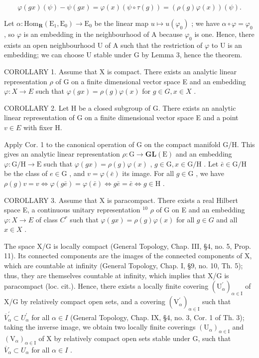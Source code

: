 \[
\varphi (g x) (\psi) - \psi (g x) = \varphi (x) (\psi \circ \tau (g)) = (\rho (g) \varphi (x)) (\psi).
\]

Let \(\alpha : \mathrm{Hom}_{\mathbf{R}}(\mathrm{E}_1, \mathrm{E}_0) \to \mathrm{E}_0\) be the linear map \(u \mapsto u(\varphi_0)\) ; we have \(\alpha \circ \varphi = \varphi_0\) , so \(\varphi\) is an embedding in the neighbourhood of A because \(\varphi_0\) is one. Hence, there exists an open neighbourhood U of A such that the restriction of \(\varphi\) to U is an embedding; we can choose U stable under G by Lemma 3, hence the theorem.

COROLLARY 1. Assume that X is compact. There exists an analytic linear representation \(\rho\) of G on a finite dimensional vector space E and an embedding \(\varphi: X \to E\) such that \(\varphi(gx) = \rho(g)\varphi(x)\) for \(g \in G, x \in X\) .

COROLLARY 2. Let H be a closed subgroup of G. There exists an analytic linear representation of G on a finite dimensional vector space E and a point \(v \in E\) with fixer H.

Apply Cor. 1 to the canonical operation of G on the compact manifold G/H. This gives an analytic linear representation \(\rho: \mathrm{G} \to \mathbf{GL}(\mathrm{E})\) and an embedding \(\varphi: \mathrm{G} / \mathrm{H} \to \mathrm{E}\) such that \(\varphi(gx) = \rho(g)\varphi(x)\) , \(g \in \mathrm{G}, x \in \mathrm{G} / \mathrm{H}\) . Let \(\bar{e} \in \mathrm{G} / \mathrm{H}\) be the class of \(e \in \mathrm{G}\) , and \(v = \varphi(\bar{e})\) its image. For all \(g \in \mathrm{G}\) , we have \(\rho(g)v = v \Longleftrightarrow \varphi(g\bar{e}) = \varphi(\bar{e}) \Longleftrightarrow g\bar{e} = \bar{e} \Longleftrightarrow g \in \mathrm{H}\) .

COROLLARY 3. Assume that X is paracompact. There exists a real Hilbert space E, a continuous unitary representation \({}^{10}\) \(\rho\) of G on E and an embedding \(\varphi: X \to E\) of class \(C^{r}\) such that \(\varphi(gx) = \rho(g)\varphi(x)\) for all \(g \in G\) and all \(x \in X\) .

The space X/G is locally compact (General Topology, Chap. III, §4, no. 5, Prop. 11). Its connected components are the images of the connected components of X, which are countable at infinity (General Topology, Chap. I, §9, no. 10, Th. 5); thus, they are themselves countable at infinity, which implies that X/G is paracompact (loc. cit.). Hence, there exists a locally finite covering \((\mathrm{U}_{\alpha}^{\prime})_{\alpha\in\mathrm{I}}\) of X/G by relatively compact open sets, and a covering \((\mathrm{V}_{\alpha}^{\prime})_{\alpha\in\mathrm{I}}\) such that \(\overline{V}_{\alpha}^{\prime}\subset U_{\alpha}^{\prime}\) for all \(\alpha\in I\) (General Topology, Chap. IX, §4, no. 3, Cor. 1 of Th. 3); taking the inverse image, we obtain two locally finite coverings \((\mathrm{U}_{\alpha})_{\alpha\in\mathrm{I}}\) and \((\mathrm{V}_{\alpha})_{\alpha\in\mathrm{I}}\) of X by relatively compact open sets stable under G, such that \(\overline{V}_{\alpha}\subset U_{\alpha}\) for all \(\alpha\in I\) .

